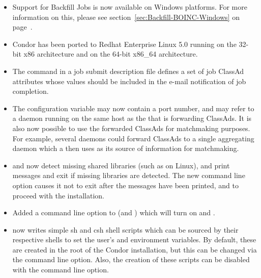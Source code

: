 \begin{itemize}

\item Support for Backfill Jobs is now available on Windows platforms.
For more information on this, please see
section~\ref{sec:Backfill-BOINC-Windows} on
page~\pageref{sec:Backfill-BOINC-Windows}.

\item Condor has been ported to Redhat Enterprise Linux
5.0 running on the 32-bit x86 architecture and on the 64-bit x86\_64
architecture.

\item The command  in a job submit
description file defines a set of job ClassAd attributes whose values
should be included in the e-mail notification of job completion.

\item The configuration variable  may now
contain a port number, and may refer to a
 daemon running on the same host as the
 that is forwarding ClassAds.  It is also now possible to
use the forwarded ClassAds for matchmaking purposes.  For example, several
 daemons could forward ClassAds to 
a single aggregating  daemon which
a  then uses as its source of information for
matchmaking.

\item {} and  now detect missing
  shared libraries (such as  on Linux), and print
  messages and exit if missing libraries are detected.  The new command
  line option  causes it not to exit
  after the messages have been printed, and to proceed with the
  installation.

\item Added a  command line option to 
  (and ) which will turn on  and
  .

\item {} now writes simple sh and csh shell scripts
  which can be sourced by their respective shells to set the user's
   and  environment variables.  By default, these
  are created in the root of the Condor installation, but this can be
  changed via the  command line option.  Also,
  the creation of these scripts can be disabled with the
   command line option.

\end{itemize}

